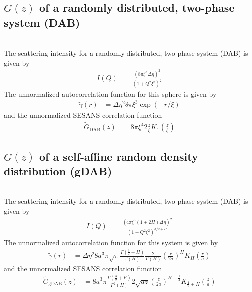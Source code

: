 \subsection{$G(z)$ of a randomly distributed, two-phase system (DAB) }~\\
\label{sec:Gz_DAB}
The scattering intensity for a randomly distributed, two-phase system (DAB) is given by
\cite{DebyeBueche1949,DAB1957,Andersson2008}
\begin{align}
I(Q) &= \frac{\left(8 \pi \xi^3 \Delta\eta\right)^2}{ \left(1+Q^2\xi^2\right)^2}
\end{align}
The unnormalized autocorrelation function for this sphere is given by
\begin{align}
\tilde{\gamma}(r) &=
 \Delta\eta^2 8\pi\xi^3 \exp\left( -r/\xi\right)
\end{align}
and the unnormalized SESANS correlation function
\begin{align}
\tilde{G}_\mathrm{DAB}(z)&= 8\pi\xi^4 2\frac{z}{\xi}K_1\left(\frac{z}{\xi}\right)
\end{align}

\subsection{$G(z)$ of a self-affine random density distribution (gDAB) }~\\
\label{sec:Gz_gDAB}
The scattering intensity for a randomly distributed, two-phase system (DAB) is given by \cite{Klimes2002,Hunter2006,Andersson2008}
\begin{align}
I(Q) &= \frac{\left(4 \pi \xi^3 (1+2H) \Delta\eta\right)^2}{ \left(1+Q^2\xi^2\right)^{3/2+H}}
\end{align}
The unnormalized autocorrelation function for this system is given by
\begin{align}
\tilde{\gamma}(r) &=
 \Delta\eta^2 8a^3\pi\sqrt{\pi}\frac{\Gamma\left(\frac{3}{2}+H\right)}{\Gamma\left(H\right)}\frac{2}{\Gamma(H)}\left(\frac{r}{2a}\right)^H K_H\left(\frac{r}{a}\right)
\end{align}
and the unnormalized SESANS correlation function
\begin{align}
\tilde{G}_\mathrm{gDAB}(z)&=  8a^3\pi\frac{\Gamma\left(\frac{3}{2}+H\right)}{\Gamma^2\left(H\right)} 2\sqrt{az}\left(\frac{z}{2a}\right)^{H+\frac12}K_{\frac12+H}\left(\frac{z}{a}\right)
\end{align}


